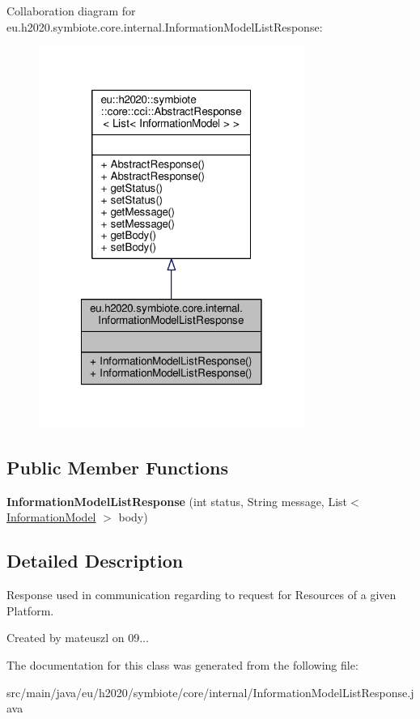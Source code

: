 Collaboration diagram for eu.\+h2020.\+symbiote.\+core.\+internal.\+Information\+Model\+List\+Response\+:
\nopagebreak
\begin{figure}[H]
\begin{center}
\leavevmode
\includegraphics[width=246pt]{classeu_1_1h2020_1_1symbiote_1_1core_1_1internal_1_1InformationModelListResponse__coll__graph}
\end{center}
\end{figure}
\subsection*{Public Member Functions}
\begin{DoxyCompactItemize}
\item 
\mbox{\label{classeu_1_1h2020_1_1symbiote_1_1core_1_1internal_1_1InformationModelListResponse_a6c00c1d1623724c3670d81b87eaf862b}} 
{\bfseries Information\+Model\+List\+Response} (int status, String message, List$<$ \hyperlink{classeu_1_1h2020_1_1symbiote_1_1model_1_1mim_1_1InformationModel}{Information\+Model} $>$ body)
\end{DoxyCompactItemize}


\subsection{Detailed Description}
Response used in communication regarding to request for Resources of a given Platform.

Created by mateuszl on 09... 

The documentation for this class was generated from the following file\+:\begin{DoxyCompactItemize}
\item 
src/main/java/eu/h2020/symbiote/core/internal/Information\+Model\+List\+Response.\+java\end{DoxyCompactItemize}
